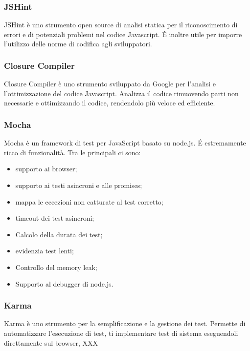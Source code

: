 \subsubsection{JSHint}
JSHint è uno strumento open source di analisi statica per il riconoscimento di errori e di potenziali problemi nel codice Javascript. \'E inoltre utile per imporre l'utilizzo delle norme di codifica agli sviluppatori.

\subsubsection{Closure Compiler}
Closure Compiler è uno strumento sviluppato da Google per l'analisi e l'ottimizzazione del codice Javascript. Analizza il codice rimuovendo parti non necessarie e ottimizzando il codice, rendendolo più veloce ed efficiente.

\subsubsection{Mocha}
Mocha è un framework di test per  JavaScript basato su node.js. \'E estremamente ricco di funzionalità. Tra le principali ci sono:
\begin{itemize}
\item supporto ai browser;
\item supporto ai testi asincroni e alle promises;
\item mappa le eccezioni non catturate al test corretto;
\item timeout dei test asincroni;
\item Calcolo della durata dei test;
\item evidenzia test lenti;
\item Controllo del memory leak;
\item Supporto al debugger di node.js.
\end{itemize}

\subsubsection{Karma}
Karma è uno strumento per la semplificazione e la gestione dei test. Permette di automatizzare l'esecuzione di test, ti implementare test di sistema eseguendoli direttamente sul browser, XXX

